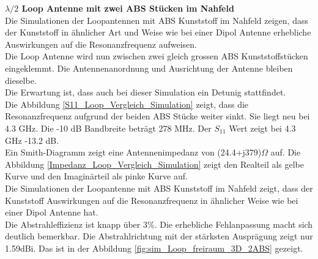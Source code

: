 \textbf{$\lambda/2$ Loop Antenne mit zwei ABS Stücken im Nahfeld}\\
Die Simulationen der Loopantennen mit ABS Kunststoff im Nahfeld zeigen, dass der Kunststoff in ähnlicher Art und Weise wie bei einer Dipol Antenne erhebliche Auswirkungen auf die Resonanzfrequenz  aufweisen.\\

Die Loop Antenne wird nun zwischen zwei gleich grossen ABS Kunststoffstücken eingeklemmt. Die Antennenanordnung und Ausrichtung der Antenne bleiben dieselbe. \\
Die Erwartung ist, dass auch bei dieser Simulation ein Detunig stattfindet.\\ 

Die Abbildung \ref{S11_Loop_Vergleich_Simulation} zeigt, dass die Resonanzfrequenz aufgrund der beiden ABS Stücke weiter sinkt. Sie liegt neu bei 4.3 GHz. Die -10 dB Bandbreite beträgt 278 MHz. Der $S_{11}$ Wert zeigt bei 4.3 GHz -13.2 dB.\\
Ein Smith-Diagramm zeigt eine Antennenimpedanz von (24.4+j379)$\Omega$ auf. Die Abbildung \ref{Impedanz_Loop_Vergleich_Simulation} zeigt den Realteil als gelbe Kurve und den Imaginärteil als pinke Kurve auf. \\
Die Simulationen der Loopantenne mit ABS Kunststoff im Nahfeld zeigt, dass der Kunststoff Auswirkungen auf die Resonanzfrequenz in ähnlicher Weise wie bei einer Dipol Antenne hat.\\
Die Abstrahleffizienz ist knapp über $3\%$. Die erhebliche Fehlanpassung macht sich deutlich bemerkbar. Die Abstrahlrichtung mit der stärksten Ausprägung zeigt nur 1.59dBi. Das ist in der Abbildung \ref{fig:sim_Loop_freiraum_3D_2ABS} gezeigt.
